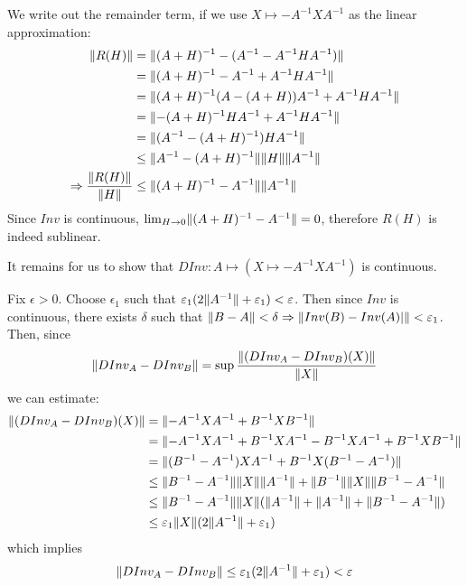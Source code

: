\documentclass[a4paper, 12pt]{article}
\begin{document}
\begin{solution}
    We write out the remainder term, if we use $X \mapsto -A^{-1}XA^{-1}$ as the linear approximation:
    \begin{align*}
        \lVert R(H)\rVert                           & = \lVert(A+H)^{-1} - (A^{-1} - A^{-1}HA^{-1}) \rVert       \\
                                              & = \lVert(A+H)^{-1} - A^{-1} + A^{-1}HA^{-1}\rVert          \\
                                              & = \lVert(A+H)^{-1}(A - (A+H)) A^{-1} + A^{-1}HA^{-1}\rVert \\
                                              & = \lVert-(A+H)^{-1}HA^{-1} + A^{-1}HA^{-1}\rVert           \\
                                              & = \lVert(A^{-1} - (A+H)^{-1})HA^{-1}\rVert                 \\
                                              & \leq \lVert A^{-1} - (A+H)^{-1}\rVert\lVert H\rVert \lVert A^{-1}\rVert \\
        \Rightarrow \frac{\lVert R(H)\rVert}{\lVert H\rVert} & \leq \lVert(A+H)^{-1} - A^{-1}\rVert\lVert A^{-1}\rVert
    \end{align*}
    Since $Inv$ is continuous, $\lim_{H \to 0}\lVert(A+H)^{-1} - A^{-1}\rVert = 0$, therefore $R(H)$ is indeed sublinear.

    It remains for us to show that $DInv: A \mapsto (X \mapsto -A^{-1}XA^{-1})$ is continuous.

    Fix $\epsilon > 0$. Choose $\epsilon_1$ such that $\varepsilon_1 (2\lVert A^{-1}\rVert + \varepsilon_1) < \varepsilon$. Then since $Inv$ is continuous, there exists $\delta$ such that $\lVert B-A\rVert < \delta \Rightarrow \lVert Inv(B) - Inv(A)|\rVert< \varepsilon_1$. Then, since \[
        \lVert DInv_A - DInv_B\rVert = \sup \frac{\lVert(DInv_A - DInv_B)(X)\rVert}{\lVert X\rVert}
    \]
    we can estimate:
    \begin{align*}
        \lVert(DInv_A - DInv_B)(X)\rVert & = \lVert-A^{-1}XA^{-1} + B^{-1}XB^{-1}\rVert                                                        \\
                                    & = \lVert-A^{-1}XA^{-1} + B^{-1}XA^{-1} - B^{-1}XA^{-1} + B^{-1}XB^{-1}\rVert                        \\
                                    & = \lVert(B^{-1} - A^{-1})XA^{-1} + B^{-1}X(B^{-1} - A^{-1})\rVert                                   \\
                                    & \leq \lVert B^{-1} - A^{-1}\rVert\lVert X\rVert\lVert A^{-1}\rVert + \lVert B^{-1}\rVert\lVert X\rVert\lVert B^{-1} - A^{-1}\rVert \\
                                    & \leq \lVert B^{-1} - A^{-1}\rVert\lVert X\rVert (\lVert A^{-1}\rVert + \lVert A^{-1}\rVert + \lVert B^{-1} - A^{-1}\rVert)   \\
                                    & \leq \varepsilon_1 \lVert X\rVert (2\lVert A^{-1}\rVert + \varepsilon_1)
    \end{align*}
    which implies \[
        \lVert DInv_A - DInv_B\rVert \leq \varepsilon_1 (2\lVert A^{-1}\rVert + \varepsilon_1) < \varepsilon
    \]


\end{solution}
\end{document}
